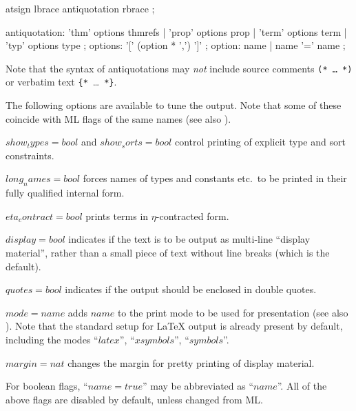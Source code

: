 \begin{rail}
  atsign lbrace antiquotation rbrace
  ;

  antiquotation:
    'thm' options thmrefs |
    'prop' options prop |
    'term' options term |
    'typ' options type
  ;
  options: '[' (option * ',') ']'
  ;
  option: name | name '=' name
  ;
\end{rail}

Note that the syntax of antiquotations may \emph{not} include source comments
\texttt{(*~\dots~*)} or verbatim text \verb|{*|~\dots~\verb|*}|.

\medskip

The following options are available to tune the output.  Note that some of
these coincide with ML flags of the same names (see also \cite{isabelle-ref}).
\begin{descr}
\item[$show_types = bool$ and $show_sorts = bool$] control printing of
  explicit type and sort constraints.
\item[$long_names = bool$] forces names of types and constants etc.\ to be
  printed in their fully qualified internal form.
\item[$eta_contract = bool$] prints terms in $\eta$-contracted form.
\item[$display = bool$] indicates if the text is to be output as multi-line
  ``display material'', rather than a small piece of text without line breaks
  (which is the default).
\item[$quotes = bool$] indicates if the output should be enclosed in double
  quotes.
\item[$mode = name$] adds $name$ to the print mode to be used for presentation
  (see also \cite{isabelle-ref}).  Note that the standard setup for {\LaTeX}
  output is already present by default, including the modes ``$latex$'',
  ``$xsymbols$'', ``$symbols$''.
\item[$margin = nat$] changes the margin for pretty printing of display
  material.
\end{descr}

For boolean flags, ``$name = true$'' may be abbreviated as ``$name$''.  All of
the above flags are disabled by default, unless changed from ML.


